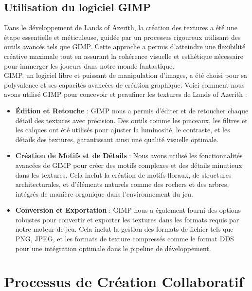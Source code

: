 \subsection{Utilisation du logiciel GIMP}

Dans le développement de Lands of Azerith, la création des textures a été une étape essentielle et méticuleuse, 
guidée par un processus rigoureux utilisant des outils avancés tels que GIMP. Cette approche a permis d'atteindre une flexibilité
 créative maximale tout en assurant la cohérence visuelle et esthétique nécessaire pour immerger les joueurs dans notre monde fantastique.
\\

GIMP, un logiciel libre et puissant de manipulation d'images, a été choisi pour sa polyvalence et ses capacités avancées de création graphique.
 Voici comment nous avons utilisé GIMP pour concevoir et peaufiner les textures de Lands of Azerith :
\\

\begin{itemize}
    \item \textbf{Édition et Retouche} : GIMP nous a permis d'éditer et de retoucher chaque détail des textures avec précision. Des outils comme les pinceaux, les filtres et les calques ont été utilisés pour ajuster la luminosité, le contraste, et les détails des textures, garantissant ainsi une qualité visuelle optimale.
    \\

    \item \textbf{Création de Motifs et de Détails} : Nous avons utilisé les fonctionnalités avancées de GIMP pour créer des motifs complexes et des détails minutieux dans les textures. Cela inclut la création de motifs floraux, de structures architecturales, et d'éléments naturels comme des rochers et des arbres, intégrés de manière organique dans l'environnement du jeu.
    \\

    \item \textbf{Conversion et Exportation} : GIMP nous a également fourni des options robustes pour convertir et exporter les textures dans les formats requis par notre moteur de jeu. Cela inclut la gestion des formats de fichier tels que PNG, JPEG, et les formats de texture compressés comme le format DDS pour une intégration optimale dans le pipeline de développement.
\end{itemize}

\section*{Processus de Création Collaboratif}

